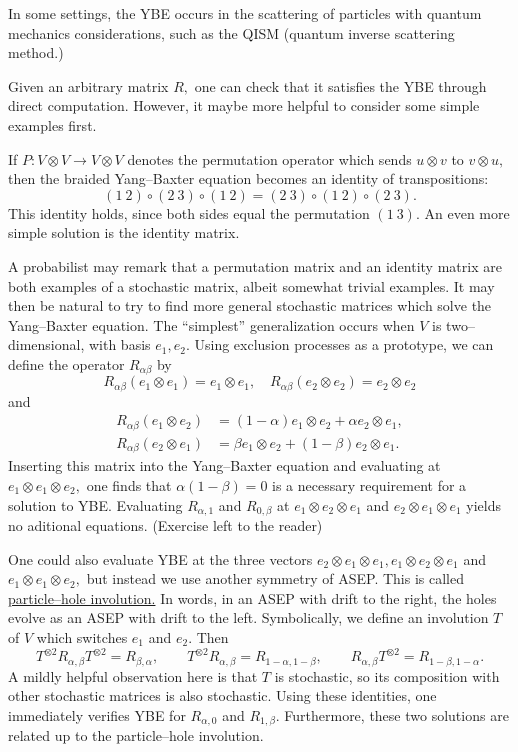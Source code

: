 \documentclass{ximera}
\begin{document}
In some settings, the YBE occurs in the scattering of particles with quantum mechanics considerations, 
such as the QISM (quantum inverse scattering method.)

Given an arbitrary matrix \(R,\) one can check that it satisfies the YBE
through direct computation. However, it maybe more helpful to consider some simple examples first. 

If \(P: V \otimes V \rightarrow V \otimes V\) denotes the permutation operator which sends
\(u \otimes v\) to \(v \otimes u,\) then the braided Yang--Baxter equation becomes an identity of transpositions:
\[
(1\ 2) \circ (2 \ 3 ) \circ (1 \ 2 ) = (2 \ 3) \circ (1 \ 2) \circ (2 \ 3).
\]
This identity holds, since both sides equal the permutation \((1\ 3).\) An even more simple solution is 
the identity matrix. 

A probabilist may remark that a permutation matrix and an identity matrix are both examples of a stochastic matrix,
albeit somewhat trivial examples. It may then be natural to try to find more general stochastic matrices
which solve the Yang--Baxter equation. The ``simplest'' generalization occurs when \(V\) is two--dimensional,
with basis \(e_1,e_2.\) Using exclusion processes as a prototype, we can define the operator $R_{\alpha\beta}$
by
\[
R_{\alpha\beta}(e_1 \otimes e_1) = e_1 \otimes e_1, \quad R_{\alpha\beta}(e_2\otimes e_2) = e_2 \otimes e_2
\]
and
\begin{align*}
R_{\alpha\beta}(e_1 \otimes e_2) &= (1-\alpha)e_1 \otimes e_2 + \alpha e_2 \otimes e_1,\\
R_{\alpha\beta}(e_2 \otimes e_1) &= \beta e_1\otimes e_2 + (1-\beta)e_2 \otimes e_1.
\end{align*}
Inserting this matrix into the Yang--Baxter equation and evaluating at \(e_1 \otimes e_1 \otimes e_2,\)
one finds that \(\alpha(1-\beta)=0\) is a necessary requirement for a solution to YBE. Evaluating
\( R_{\alpha,1}\) and \(R_{0,\beta}\) at \(e_1\otimes e_2 \otimes e_1\) and \(e_2 \otimes e_1 \otimes e_1\)
yields no aditional equations. (Exercise left to the reader)

One could also evaluate YBE at the three vectors \(e_2 \otimes e_1 \otimes e_1,e_1\otimes e_2 \otimes e_1\)
and \(e_1 \otimes e_1 \otimes e_2,\) but instead we use another symmetry of ASEP. This is called
\underline{particle--hole involution.} In words, in an ASEP with drift to the right, the holes evolve
as an ASEP with drift to the left. Symbolically, we define an involution \(T\) of \(V\) which
switches \(e_1\) and \(e_2.\) Then 
\[
T^{\otimes 2} R_{\alpha,\beta}T^{\otimes 2} = R_{\beta,\alpha}, \quad \quad T^{\otimes 2} R_{\alpha,\beta} = R_{1-\alpha,1-\beta}, \quad \quad R_{\alpha,\beta}T^{\otimes 2} = R_{1-\beta,1-\alpha}.
\]
A mildly helpful observation here is that \(T\) is stochastic, so its composition with other stochastic
matrices is also stochastic. Using these identities, one immediately verifies YBE for 
\(R_{\alpha,0}\) and \(R_{1,\beta}.\) Furthermore, these two solutions are related up to the particle--hole involution.
\end{document}

